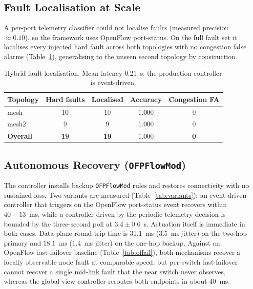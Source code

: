 \documentclass[12pt,a4paper]{report}
\begin{document}
\subsection{Fault Localisation at Scale}
A per-port telemetry classifier could not localise faults (measured precision
$\approx 0.10$), so the framework uses OpenFlow port-status. On the full fault set it
localises every injected hard fault across both topologies with no congestion false alarms
(Table~\ref{tab:localize}), generalising to the unseen second topology by construction.

\begin{table}[t]
\centering
\caption{Hybrid fault localisation. Mean latency $0.21$~s; the production controller is
event-driven.}
\label{tab:localize}
\begin{tabular}{lcccc}
\toprule
Topology & Hard faults & Localised & Accuracy & Congestion FA \\
\midrule
mesh & 10 & 10 & $1.000$ & 0 \\
mesh2 & 9 & 9 & $1.000$ & 0 \\
\midrule
\textbf{Overall} & \textbf{19} & \textbf{19} & $\mathbf{1.000}$ & \textbf{0} \\
\bottomrule
\end{tabular}
\end{table}

\subsection{Autonomous Recovery (\texttt{OFPFlowMod})}
The controller installs backup \texttt{OFPFlowMod} rules and restores connectivity with no
sustained loss. Two variants are measured (Table~\ref{tab:variants}): an event-driven
controller that triggers on the OpenFlow port-status event recovers within $40\pm13$~ms,
while a controller driven by the periodic telemetry decision is bounded by the three-second
poll at $3.4\pm0.6$~s. %
Actuation itself is immediate in both cases. Data-plane round-trip time is $31.1$~ms
($3.5$~ms jitter) on the two-hop primary and $18.1$~ms ($1.4$~ms jitter) on the one-hop
backup. Against an OpenFlow fast-failover baseline (Table~\ref{tab:offail}), both mechanisms
recover a locally observable node fault at comparable speed, but per-switch fast-failover
cannot recover a single mid-link fault that the near switch never observes, whereas the
global-view controller reroutes both endpoints in about $40$~ms.
\end{document}
